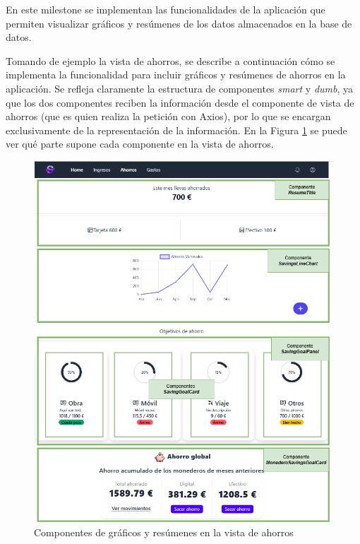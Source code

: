 En este milestone se implementan las funcionalidades de la aplicación que permiten visualizar gráficos y resúmenes de los datos almacenados en la base de datos.

Tomando de ejemplo la vista de ahorros, se describe a continuación cómo se implementa la funcionalidad para incluir gráficos y resúmenes de ahorros en la aplicación. Se refleja claramente la estructura de componentes \textit{smart} y \textit{dumb}, ya que los dos componentes reciben la información desde el componente de vista de ahorros (que es quien realiza la petición con Axios), por lo que se encargan exclusivamente de la representación de la información. En la Figura \ref{fig:componentes_graficos_resumenes} se puede ver qué parte supone cada componente en la vista de ahorros.

\begin{figure}[ht!]
    \centering
    \includegraphics[width=\linewidth]{imagenes/componente-graficos-resumenes.drawio.png}
    \caption{Componentes de gráficos y resúmenes en la vista de ahorros}
    \label{fig:componentes_graficos_resumenes}
\end{figure}


